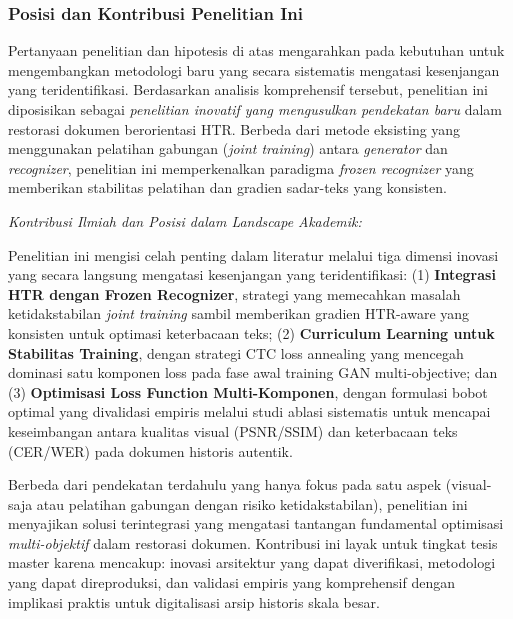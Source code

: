 \documentclass[12pt,a4paper]{book}
\begin{document}
\subsubsection{Posisi dan Kontribusi Penelitian Ini}
\label{subsubsec:research-positioning}

\vspace{1.5ex}

Pertanyaan penelitian dan hipotesis di atas mengarahkan pada kebutuhan untuk mengembangkan metodologi baru yang secara sistematis mengatasi kesenjangan yang teridentifikasi. Berdasarkan analisis komprehensif tersebut, penelitian ini diposisikan sebagai \textit{penelitian inovatif yang mengusulkan pendekatan baru} dalam restorasi dokumen berorientasi HTR. Berbeda dari metode eksisting yang menggunakan pelatihan gabungan (\textit{joint training}) antara \textit{generator} dan \textit{recognizer}, penelitian ini memperkenalkan paradigma \textit{frozen recognizer} yang memberikan stabilitas pelatihan dan gradien sadar-teks yang konsisten.

\vspace{0.5ex}
\textit{Kontribusi Ilmiah dan Posisi dalam Landscape Akademik:}

\vspace{0.3em}
Penelitian ini mengisi celah penting dalam literatur melalui tiga dimensi inovasi yang secara langsung mengatasi kesenjangan yang teridentifikasi: (1) \textbf{Integrasi HTR dengan Frozen Recognizer}, strategi yang memecahkan masalah ketidakstabilan \textit{joint training} sambil memberikan gradien HTR-aware yang konsisten untuk optimasi keterbacaan teks; (2) \textbf{Curriculum Learning untuk Stabilitas Training}, dengan strategi CTC loss annealing yang mencegah dominasi satu komponen loss pada fase awal training GAN multi-objective; dan (3) \textbf{Optimisasi Loss Function Multi-Komponen}, dengan formulasi bobot optimal yang divalidasi empiris melalui studi ablasi sistematis untuk mencapai keseimbangan antara kualitas visual (PSNR/SSIM) dan keterbacaan teks (CER/WER) pada dokumen historis autentik.

\vspace{0.3em}
Berbeda dari pendekatan terdahulu yang hanya fokus pada satu aspek (visual-saja atau pelatihan gabungan dengan risiko ketidakstabilan), penelitian ini menyajikan solusi terintegrasi yang mengatasi tantangan fundamental optimisasi \textit{multi-objektif} dalam restorasi dokumen. Kontribusi ini layak untuk tingkat tesis master karena mencakup: inovasi arsitektur yang dapat diverifikasi, metodologi yang dapat direproduksi, dan validasi empiris yang komprehensif dengan implikasi praktis untuk digitalisasi arsip historis skala besar.
\end{document}
